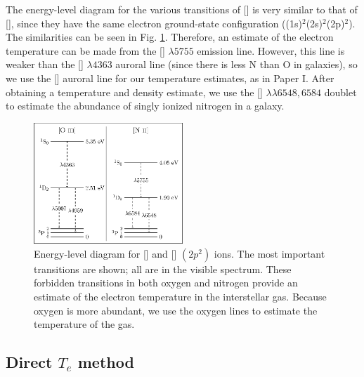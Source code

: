 The energy-level diagram for the various transitions of [] is very 
similar to that of [], since they have the same electron ground-state 
configuration ((1s)$^2$(2s)$^2$(2p)$^2$).  The similarities can be seen in Fig. 
\ref{fig:transitions_P2}.  Therefore, an estimate of the electron temperature can 
be made from the [] $\lambda 5755$ emission line.  However, this line 
is weaker than the [] $\lambda 4363$ auroral line (since there is less 
N than O in galaxies), so we use the [] auroral line for our 
temperature estimates, as in Paper I.  After obtaining a temperature and density 
estimate, we use the [] $\lambda \lambda 6548, 6584$ doublet to 
estimate the abundance of singly ionized nitrogen in a galaxy.

\begin{figure}
    \centering
    \includegraphics[width=0.5\textwidth]{Images/Paper2/NIIOIII_energy_level_diagram-figure0}
    \caption[{[] and [] energy-level diagram}]{Energy-level 
    diagram for [] and [] $(2p^2)$ ions.  The most important 
    transitions are shown; all are in the visible spectrum.  These forbidden 
    transitions in both oxygen and nitrogen provide an estimate of the electron 
    temperature in the interstellar gas.  Because oxygen is more abundant, we 
    use the oxygen lines to estimate the temperature of the gas.}
    \label{fig:transitions_P2}
\end{figure}


\subsection{Direct $T_e$ method}

